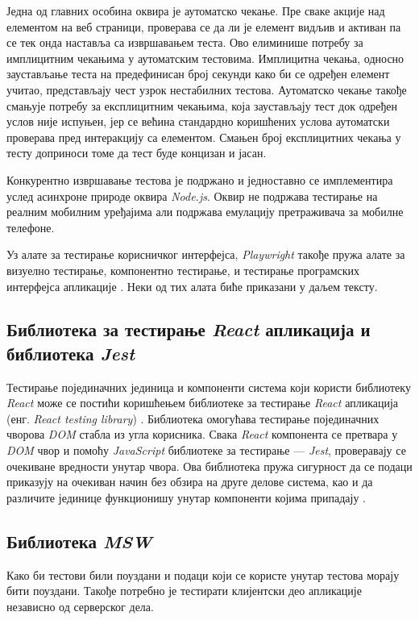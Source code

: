 \documentclass[12pt,oneside]{memoir}
\begin{document}
Једна од главних особина оквира је аутоматско чекање. Пре сваке акције над елементом на веб страници, проверава се да ли је елемент видљив и активан па се тек онда наставља са извршавањем теста. Ово елиминише потребу за имплицитним чекањима у аутоматским тестовима. Имплицитна чекања, односно заустављање теста на предефинисан број секунди како би се одређен елемент учитао, представљају чест узрок нестабилних тестова. Аутоматско чекање такође смањује потребу за експлицитним чекањима, која заустављају тест док одређен услов није испуњен, јер се већина стандардно коришћених услова аутоматски проверава пред интеракцију са елементом. Смањен број експлицитних чекања у тесту доприноси томе да тест буде концизан и јасан.

Конкурентно извршавање тестова је подржано и једноставно се имплементира услед асинхроне природе оквира \textit{Node.js}. Оквир не подржава тестирање на реалним мобилним уређајима али подржава емулацију претраживача за мобилне телефоне.

Уз алате за тестирање корисничког интерфејса, \textit{Playwright} такође пружа алате за визуелно тестирање, компонентно тестирање, и тестирање програмских интерфејса апликације \cite{playwright}. Неки од тих алата биће приказани у даљем тексту.

\subsection{Библиотека за тестирање \textit{React} апликација и  библиотека \textit{Jest}}

Тестирање појединачних јединица и компоненти система који користи библиотеку \textit{React} може се постићи коришћењем библиотеке за тестирање \textit{React} апликација (енг.\textit{ React testing library}) \cite{rtl}. Библиотека омогућава тестирање појединачних чворова \textit{DOM} стабла из угла корисника. Свака \textit{React} компонента се претвара у \textit{DOM} чвор и помоћу \textit{JavaScript} библиотеке за тестирање --- \textit{Jest}, проверавају се очекиване вредности унутар чвора. Ова библиотека пружа сигурност да се подаци приказују на очекиван начин без обзира на друге делове система, као и да различите јединице функционишу унутар компоненти којима припадају \cite{rtl,jest}.


\subsection{Библиотека \textit{MSW}}

Како би тестови били поуздани и подаци који се користе унутар тестова морају бити поуздани. Такође потребно је тестирати клијентски део апликације независно од серверског дела. 
\end{document}
